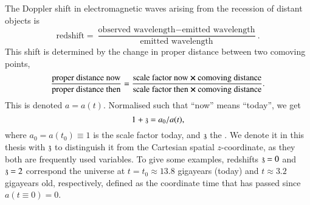 


    The Doppler shift in electromagnetic waves arising from the recession of distant objects is %
    \begin{equation*}
        \text{redshift} = 
        \frac{\text{observed wavelength} - \text{emitted wavelength} }{\text{emitted wavelength} }.
    \end{equation*}
    This shift is determined by the change in proper distance between two comoving points, 
    \begin{equation*}
        \frac{\text{proper distance now}}{\text{proper distance then}} = \frac{\text{scale factor now}\cross \text{comoving distance}}{\text{scale factor then}\cross \text{comoving distance}}.
    \end{equation*}
    This  is denoted $a= a(t)$. Normalised such that ``now'' means ``today'', we get 
    \begin{equation}
        1 + \mathfrak{z} = a_0/a(t),
    \end{equation}
    where $a_0 = a(t_0)\equiv 1$ is the scale factor today, and $\mathfrak{z}$ the . 
    We denote it in this thesis with $\mathfrak{z}$ to distinguish it from the Cartesian spatial $z$-coordinate, as they both are frequently used variables. %
    To give some examples, redshifts $\mathfrak{z} = 0$ and $\mathfrak{z}=2$ correspond the universe at $t=t_0 \approx 13.8$ gigayears (today) and $t\approx 3.2$ gigayears old, respectively, defined as the coordinate time that has passed since $a(t\equiv 0)=0$.




